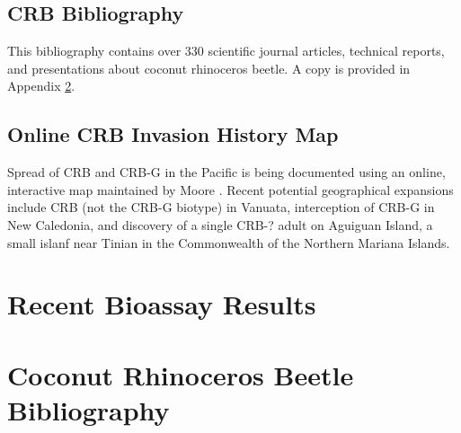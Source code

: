 \documentclass[12pt,letterpaper,english,bibliography=totocnumbered]{scrartcl}
\begin{document}
\subsection{CRB Bibliography}

This bibliography contains over 330 scientific journal articles, technical reports, and presentations about coconut rhinoceros beetle. A copy is provided in Appendix \ref{crb-bibliography}.

\subsection{Online CRB Invasion History Map}

Spread of CRB and CRB-G in the Pacific is being documented using an online, interactive map maintained by Moore \cite{moore_web_2019}. Recent potential geographical expansions include CRB (not the CRB-G biotype) in Vanuata, interception of CRB-G in New Caledonia, and discovery of a single CRB-? adult on Aguiguan Island, a small islanf near Tinian in the Commonwealth of the Northern Mariana Islands.

\newpage
\printbibliography

\newpage
\appendix
\appendixpage
\addappheadtotoc

\section{Recent Bioassay Results}\label{recent-bioassay-results}










\section{Coconut Rhinoceros Beetle Bibliography}\label{crb-bibliography}

\end{document}
